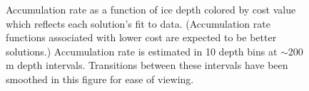 
\begin{figure}[ht]
\centering
{}
\caption[]{Accumulation rate as a function of ice depth colored by cost value which reflects each solution's fit to data. (Accumulation rate functions associated with lower cost are expected to be better solutions.) Accumulation rate is estimated in 10 depth bins at $\sim$200 m depth intervals. Transitions between these intervals have been smoothed in this figure for ease of viewing.}
\label{fig:accumdepth}
\end{figure}





